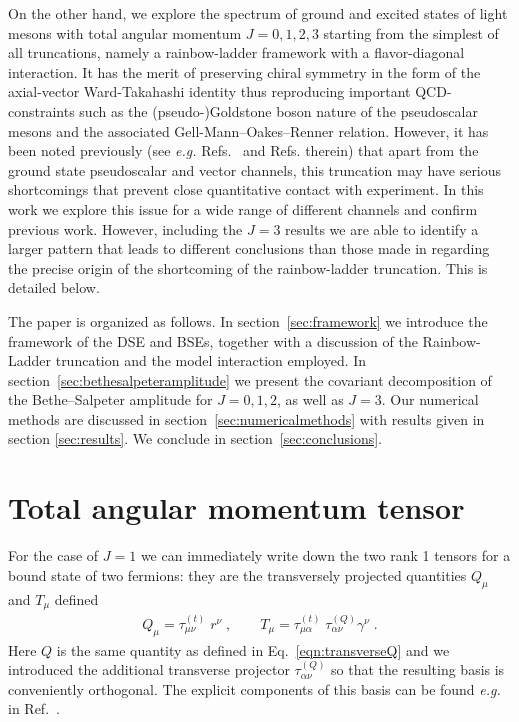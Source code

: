 On the other hand, we explore the spectrum of ground and excited states of light mesons with total 
angular momentum $J=0,1,2,3$ starting from the simplest of all truncations, namely a rainbow-ladder 
framework with a flavor-diagonal interaction. It has the merit of preserving chiral symmetry in the 
form of the axial-vector Ward-Takahashi identity thus reproducing important QCD-constraints such as
the (pseudo-)Goldstone boson nature of the pseudoscalar mesons and the associated Gell-Mann--Oakes--Renner
relation. However, it has been noted previously
(see \emph{e.g.} Refs.~\cite{Qin:2011xq,Blank:2011ha} and Refs. therein) that apart from the ground 
state pseudoscalar 
and vector channels, this truncation may have serious shortcomings that prevent close quantitative 
contact with experiment. In this work we explore this issue for a wide range of different channels 
and confirm previous work. However, including the $J=3$ results we are able to identify a larger 
pattern that leads to different conclusions than those made in \cite{Qin:2011xq} regarding the 
precise origin of the shortcoming of the rainbow-ladder truncation. This is detailed below.

The paper is organized as follows. In section~\ref{sec:framework} we introduce the framework of the 
DSE and BSEs, together with a discussion of the Rainbow-Ladder truncation and the model interaction 
employed. In section~\ref{sec:bethesalpeteramplitude} we present the covariant decomposition of 
the Bethe--Salpeter amplitude for $J=0,1,2$, as well as $J=3$. Our numerical methods are discussed 
in section~\ref{sec:numericalmethods} with results given in section \ref{sec:results}. We conclude 
in section~\ref{sec:conclusions}.

\section{Total angular momentum tensor}
For the case of $J=1$ we can immediately write down the two rank 1 tensors for a bound state of two
fermions: they are the transversely projected quantities $Q_\mu$ and $T_\mu$ defined 
%
\begin{align}\label{eqn:transverseprojectors}
Q_{\mu} = \tau^{(t)}_{\mu\nu}\; r^\nu\;,\qquad
T_{\mu} = \tau^{(t)}_{\mu\alpha}\; \tau^{(Q)}_{\alpha\nu}\gamma^\nu\;.
\end{align}
%
Here $Q$ is the same quantity as defined in Eq.~\eqref{eqn:transverseQ} and we introduced the 
additional transverse projector $\tau^{(Q)}_{\alpha\nu}$ so that the resulting basis is 
conveniently orthogonal. The explicit components of this basis can be found {\it e.g.} in 
Ref.~\cite{Maris:1999nt}.


